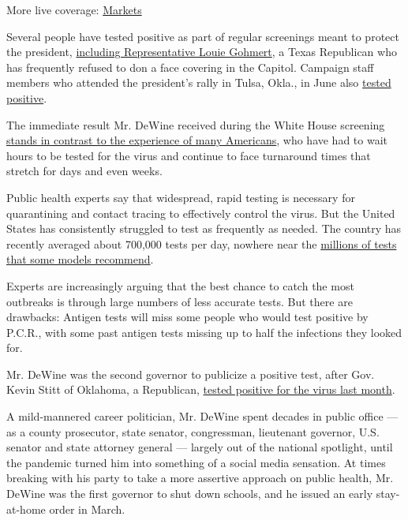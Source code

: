 More live coverage:
\href{https://www.nytimes3xbfgragh.onion/live/2020/08/20/business/stock-market-today-coronavirus?action=click\&pgtype=Article\&state=default\&region=MAIN_CONTENT_1\&context=storylines_live_updates}{Markets}

Several people have tested positive as part of regular screenings meant
to protect the president,
\href{https://www.nytimes3xbfgragh.onion/2020/07/29/us/politics/louie-gohmert-positive-coronavirus-mask.html}{including
Representative Louie Gohmert}, a Texas Republican who has frequently
refused to don a face covering in the Capitol. Campaign staff members
who attended the president's rally in Tulsa, Okla., in June also
\href{https://www.nytimes3xbfgragh.onion/2020/06/22/us/politics/trump-campaign-coronavirus-tulsa.html}{tested
positive}.

The immediate result Mr. DeWine received during the White House
screening
\href{https://www.nytimes3xbfgragh.onion/2020/08/04/us/virus-testing-delays.html}{stands
in contrast to the experience of many Americans}, who have had to wait
hours to be tested for the virus and continue to face turnaround times
that stretch for days and even weeks.

Public health experts say that widespread, rapid testing is necessary
for quarantining and contact tracing to effectively control the virus.
But the United States has consistently struggled to test as frequently
as needed. The country has recently averaged about 700,000 tests per
day, nowhere near the
\href{https://drive.google.com/file/d/1EhUfmT6ayG3ERxX-wZUmB2wtIEOhRAmP/view}{millions
of tests that some models recommend}.

Experts are increasingly arguing that the best chance to catch the most
outbreaks is through large numbers of less accurate tests. But there are
drawbacks: Antigen tests will miss some people who would test positive
by P.C.R., with some past antigen tests missing up to half the
infections they looked for.

Mr. DeWine was the second governor to publicize a positive test, after
Gov. Kevin Stitt of Oklahoma, a Republican,
\href{https://www.nytimes3xbfgragh.onion/2020/07/15/us/oklahoma-governor-coronavirus-stitt.html}{tested
positive for the virus last month}.

A mild-mannered career politician, Mr. DeWine spent decades in public
office --- as a county prosecutor, state senator, congressman,
lieutenant governor, U.S. senator and state attorney general --- largely
out of the national spotlight, until the pandemic turned him into
something of a social media sensation. At times breaking with his party
to take a more assertive approach on public health, Mr. DeWine was the
first governor to shut down schools, and he issued an early stay-at-home
order in March.

